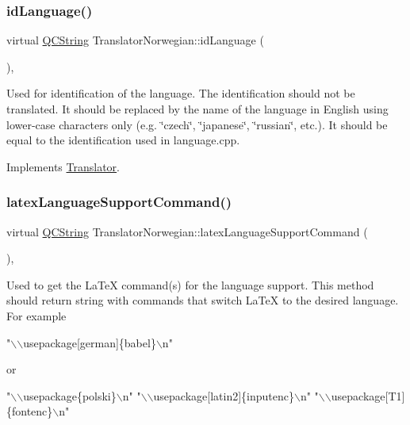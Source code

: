 \subsubsection{\texorpdfstring{idLanguage()}{idLanguage()}}
{\footnotesize\ttfamily virtual \mbox{\hyperlink{class_q_c_string}{Q\+C\+String}} Translator\+Norwegian\+::id\+Language (\begin{DoxyParamCaption}{ }\end{DoxyParamCaption})\hspace{0.3cm}{\ttfamily [inline]}, {\ttfamily [virtual]}}

Used for identification of the language. The identification should not be translated. It should be replaced by the name of the language in English using lower-\/case characters only (e.\+g. \char`\"{}czech\char`\"{}, \char`\"{}japanese\char`\"{}, \char`\"{}russian\char`\"{}, etc.). It should be equal to the identification used in language.\+cpp. 

Implements \mbox{\hyperlink{class_translator}{Translator}}.

\mbox{\label{class_translator_norwegian_a59264b538f75aa76543ec402b2ef38f9}} 
\subsubsection{\texorpdfstring{latexLanguageSupportCommand()}{latexLanguageSupportCommand()}}
{\footnotesize\ttfamily virtual \mbox{\hyperlink{class_q_c_string}{Q\+C\+String}} Translator\+Norwegian\+::latex\+Language\+Support\+Command (\begin{DoxyParamCaption}{ }\end{DoxyParamCaption})\hspace{0.3cm}{\ttfamily [inline]}, {\ttfamily [virtual]}}

Used to get the La\+TeX command(s) for the language support. This method should return string with commands that switch La\+TeX to the desired language. For example 
\begin{DoxyPre}"\(\backslash\)\(\backslash\)usepackage[german]\{babel\}\(\backslash\)n"
\end{DoxyPre}
 or 
\begin{DoxyPre}"\(\backslash\)\(\backslash\)usepackage\{polski\}\(\backslash\)n"
"\(\backslash\)\(\backslash\)usepackage[latin2]\{inputenc\}\(\backslash\)n"
"\(\backslash\)\(\backslash\)usepackage[T1]\{fontenc\}\(\backslash\)n"
\end{DoxyPre}
 

